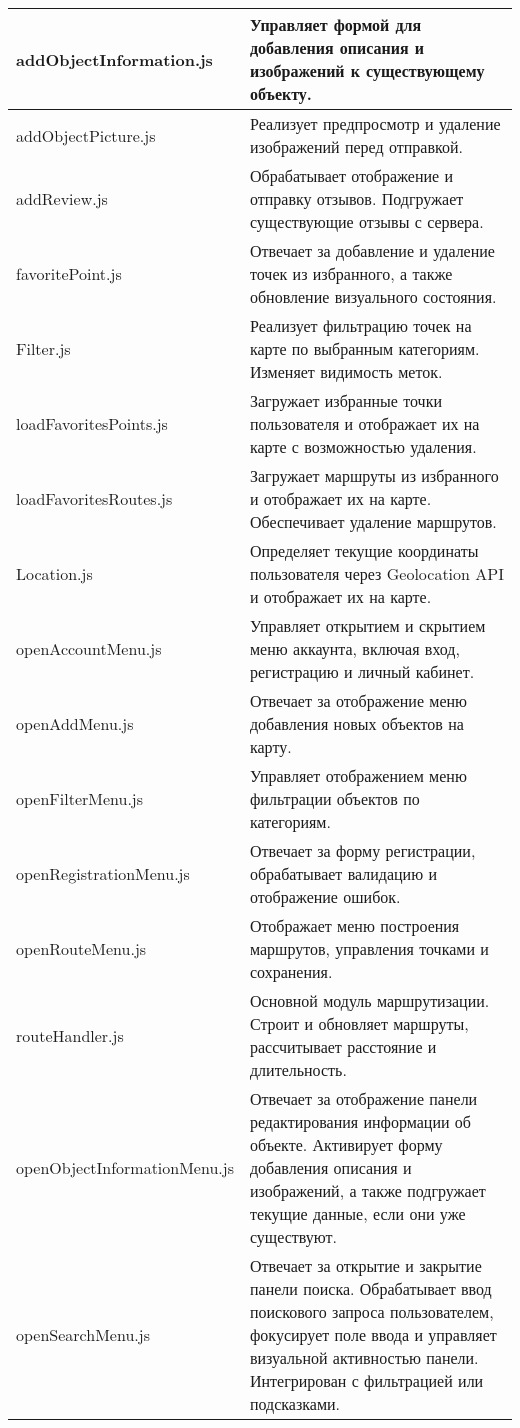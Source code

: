\begin{xltabular}{\textwidth}{|p{4cm}|X|}
\hline addObject\-Information.js & Управляет формой для добавления описания и изображений к существующему объекту.\\
\hline addObjectPicture.js & Реализует предпросмотр и удаление изображений перед отправкой.\\
\hline addReview.js & Обрабатывает отображение и отправку отзывов. Подгружает существующие отзывы с сервера.\\
\hline favoritePoint.js & Отвечает за добавление и удаление точек из избранного, а также обновление визуального состояния.\\
\hline Filter.js & Реализует фильтрацию точек на карте по выбранным категориям. Изменяет видимость меток.\\
\hline loadFavorites\-Points.js & Загружает избранные точки пользователя и отображает их на карте с возможностью удаления.\\
\hline loadFavorites\-Routes.js & Загружает маршруты из избранного и отображает их на карте. Обеспечивает удаление маршрутов.\\
\hline Location.js & Определяет текущие координаты пользователя через Geolocation API и отображает их на карте.\\
\hline openAccount\-Menu.js & Управляет открытием и скрытием меню аккаунта, включая вход, регистрацию и личный кабинет.\\
\hline openAddMenu.js & Отвечает за отображение меню добавления новых объектов на карту.\\
\hline openFilterMenu.js & Управляет отображением меню фильтрации объектов по категориям.\\
\hline openRegistration\-Menu.js & Отвечает за форму регистрации, обрабатывает валидацию и отображение ошибок.\\
\hline openRouteMenu.js & Отображает меню построения маршрутов, управления точками и сохранения.\\
\hline routeHandler.js & Основной модуль маршрутизации. Строит и обновляет маршруты, рассчитывает расстояние и длительность.\\
\hline openObjectInfor\-mationMenu.js & Отвечает за отображение панели редактирования информации об объекте. Активирует форму добавления описания и изображений, а также подгружает текущие данные, если они уже существуют.\\
\hline openSearchMenu.js & Отвечает за открытие и закрытие панели поиска. Обрабатывает ввод поискового запроса пользователем, фокусирует поле ввода и управляет визуальной активностью панели. Интегрирован с фильтрацией или подсказками.\\
\end{xltabular}

